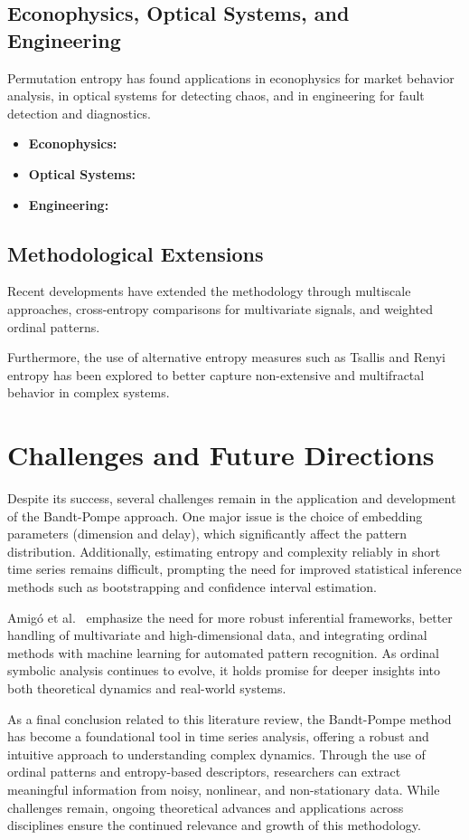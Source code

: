\subsection{Econophysics, Optical Systems, and Engineering}
Permutation entropy has found applications in econophysics for market behavior analysis, in optical systems for detecting chaos, and in engineering for fault detection and diagnostics.
\begin{itemize}
	\item \textbf{Econophysics:}
	
	\item \textbf{Optical Systems:}
	
	\item \textbf{Engineering:}
\end{itemize}

\subsection{Methodological Extensions}
Recent developments have extended the methodology through multiscale approaches, cross-entropy comparisons for multivariate signals, and weighted ordinal patterns.

 

Furthermore, the use of alternative entropy measures such as Tsallis and Renyi entropy has been explored to better capture non-extensive and multifractal behavior in complex systems.

\section{Challenges and Future Directions}
Despite its success, several challenges remain in the application and development of the Bandt-Pompe approach. One major issue is the choice of embedding parameters (dimension and delay), which significantly affect the pattern distribution. Additionally, estimating entropy and complexity reliably in short time series remains difficult, prompting the need for improved statistical inference methods such as bootstrapping and confidence interval estimation.

Amigó et al.~\cite{amigo2023ordinal} emphasize the need for more robust inferential frameworks, better handling of multivariate and high-dimensional data, and integrating ordinal methods with machine learning for automated pattern recognition. As ordinal symbolic analysis continues to evolve, it holds promise for deeper insights into both theoretical dynamics and real-world systems.

As a final conclusion related to this literature review, the Bandt-Pompe method has become a foundational tool in time series analysis, offering a robust and intuitive approach to understanding complex dynamics. Through the use of ordinal patterns and entropy-based descriptors, researchers can extract meaningful information from noisy, nonlinear, and non-stationary data. While challenges remain, ongoing theoretical advances and applications across disciplines ensure the continued relevance and growth of this methodology.





